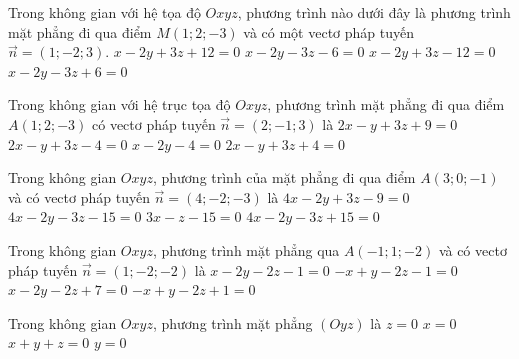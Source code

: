 \begin{ex}%
	Trong không gian với hệ tọa độ $O x y z$, phương trình nào dưới đây là phương trình mặt phẳng đi qua điểm $M(1 ; 2 ;-3)$ và có một vectơ pháp tuyến $\vec{n}=(1 ;-2 ; 3)$.
	\choice
	{\True $x-2 y+3 z+12=0$}
	{$x-2 y-3 z-6=0$}
	{$x-2 y+3 z-12=0$}
	{$x-2 y-3 z+6=0$}
\end{ex}
\begin{ex}%
	Trong không gian với hệ trục tọa độ $Oxyz$, phương trình mặt phẳng đi qua điểm $A(1 ; 2 ;-3)$ có vectơ pháp tuyến $\vec{n}=(2 ;-1 ; 3)$ là
	\choice
	{\True $2 x-y+3 z+9=0$}
	{$2 x-y+3 z-4=0$}
	{$x-2 y-4=0$}
	{$2 x-y+3 z+4=0$}
\end{ex}

\begin{ex}%
	Trong không gian $O x y z$, phương trình của mặt phẳng đi qua điểm $A(3 ; 0 ;-1)$ và có vectơ pháp tuyến $\vec{n}=(4 ;-2 ;-3)$ là
	\choice
	{$4x-2 y+3z-9=0$}
	{\True $4x-2y-3z-15=0$}
	{$3x-z-15=0$}
	{$4x-2y-3z+15=0$}
\end{ex}

\begin{ex}%
	Trong không gian $Oxyz$, phương trình mặt phẳng qua $A(-1 ; 1 ;-2)$ và có vectơ  pháp tuyến $\vec{n}=(1 ;-2 ;-2)$ là
	\choice
	{\True $x-2 y-2 z-1=0$}
	{$-x+y-2z-1=0$}
	{$x-2y-2z+7=0$}
	{$-x+y-2z+1=0$}
\end{ex}

\begin{ex}%
	Trong không gian $Oxyz$, phương trình mặt phẳng $(Oyz)$ là
	\choice
	{$z=0$}
	{\True $x=0$}
	{$x+y+z=0$}
	{$y=0$}
\end{ex}

